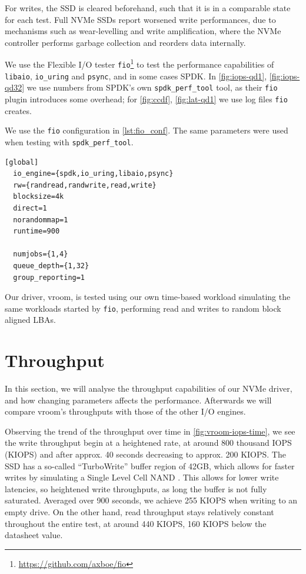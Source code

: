 For writes, the SSD is cleared beforehand, such that it is in a comparable state for each test. Full NVMe SSDs report worsened write performances, due to mechanisms such as wear-levelling and write amplification, where the NVMe controller performs garbage collection and reorders data internally.


We use the Flexible I/O tester \texttt{fio}\footnote{\url{https://github.com/axboe/fio}} to test the performance capabilities of \texttt{libaio}, \texttt{io\_uring} and \texttt{psync}, and in some cases SPDK. In \autoref{fig:iops-qd1}, \autoref{fig:iops-qd32} we use numbers from SPDK's own \texttt{spdk\_perf\_tool} tool, as their \texttt{fio} plugin introduces some overhead; for \autoref{fig:ccdf}, \autoref{fig:lat-qd1} we use log files \texttt{fio} creates.

We use the \texttt{fio} configuration in \autoref{lst:fio_conf}. The same parameters were used when testing with \texttt{spdk\_perf\_tool}.

\begin{lstlisting}[float, label=lst:fio_conf, caption=\texttt{fio} configuration]
  [global]
  io_engine={spdk,io_uring,libaio,psync}
  rw={randread,randwrite,read,write}
  blocksize=4k
  direct=1
  norandommap=1
  runtime=900

  numjobs={1,4}
  queue_depth={1,32}
  group_reporting=1
\end{lstlisting}

Our driver, vroom, is tested using our own time-based workload simulating the same workloads started by \texttt{fio}, performing read and writes to random block aligned LBAs.

\section{Throughput}
In this section, we will analyse the throughput capabilities of our NVMe driver, and how changing parameters affects the performance. Afterwards we will compare vroom's throughputs with those of the other I/O engines.

Observing the trend of the throughput over time in \autoref{fig:vroom-iops-time}, we see the write throughput begin at a heightened rate, at around 800 thousand IOPS (KIOPS) and after approx. 40 seconds decreasing to approx. 200 KIOPS. The SSD has a so-called ``TurboWrite'' buffer region of 42GB, which allows for faster writes by simulating a Single Level Cell NAND \cite{turbowrite}. This allows for lower write latencies, so heightened write throughputs, as long the buffer is not fully saturated. Averaged over 900 seconds, we achieve 255 KIOPS when writing to an empty drive. On the other hand, read throughput stays relatively constant throughout the entire test, at around 440 KIOPS, 160 KIOPS below the datasheet value.

